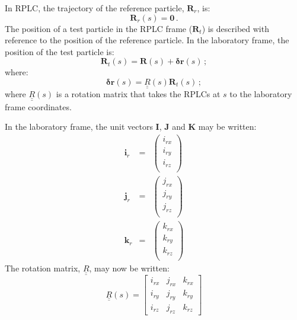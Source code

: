In RPLC, the trajectory of the reference particle, $\bm{R}_r$, is:
\begin{equation}
  \bm{R}_r(s) = \bm{0}\,.
\end{equation}
The position of a test particle in the RPLC frame ($\bm{R}_{t}$) is
described with reference to the position of the reference particle.
In the laboratory frame, the position of the test particle is:
\begin{equation}
  \bm{R}_{t}(s) = \bm{R}(s) + \bm{\delta r}(s) \,;
\end{equation}
where:
\begin{equation}
  \bm{\delta r}(s) = \underline{\underline{R}}(s) \bm{R}_t(s) \,;
\end{equation}
where $\underline{\underline{R}}(s)$ is a rotation matrix that takes
the RPLCs at $s$ to the laboratory frame coordinates.

In the laboratory frame, the unit vectors $\bm{I}$, $\bm{J}$ and
$\bm{K}$ may be written: 
\begin{eqnarray}
  \bm{i}_r & = & \begin{pmatrix} i_{rx} \\ i_{ry} \\  i_{rz} \\ \end{pmatrix} \nonumber \\
  \bm{j}_r & = & \begin{pmatrix} j_{rx} \\ j_{ry} \\  j_{rz} \\ \end{pmatrix} \nonumber \\
  \bm{k}_r & = & \begin{pmatrix} k_{rx} \\ k_{ry} \\  k_{rz} \\ \end{pmatrix} \nonumber
\end{eqnarray}
The rotation matrix, $\underline{\underline{R}}$, may now be written:
\begin{equation}
  \underline{\underline{R}}(s) =
    \begin{bmatrix}
      i_{rx} & j_{rx} & k_{rx} \\
      i_{ry} & j_{ry} & k_{ry} \\
      i_{rz} & j_{rz} & k_{rz} 
    \end{bmatrix}
\end{equation}
